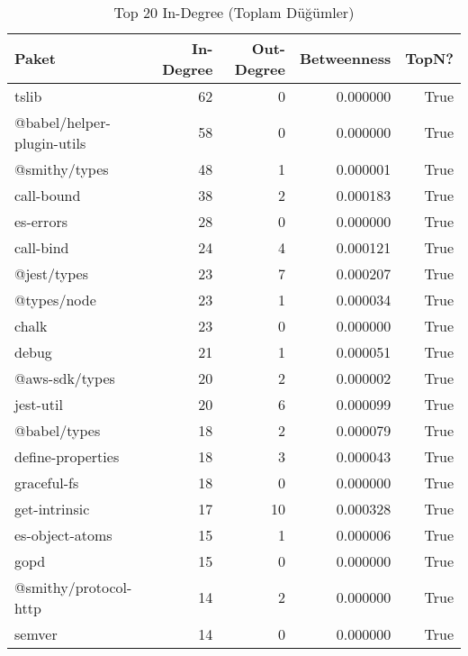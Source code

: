 \begin{table}[h]
\centering
\\\caption{Top 20 In-Degree (Toplam Düğümler)}
\begin{tabular}{lrrrr}
\toprule
Paket & In-Degree & Out-Degree & Betweenness & TopN? \\ \midrule
tslib & 62 & 0 & 0.000000 & True \\
@babel/helper-plugin-utils & 58 & 0 & 0.000000 & True \\
@smithy/types & 48 & 1 & 0.000001 & True \\
call-bound & 38 & 2 & 0.000183 & True \\
es-errors & 28 & 0 & 0.000000 & True \\
call-bind & 24 & 4 & 0.000121 & True \\
@jest/types & 23 & 7 & 0.000207 & True \\
@types/node & 23 & 1 & 0.000034 & True \\
chalk & 23 & 0 & 0.000000 & True \\
debug & 21 & 1 & 0.000051 & True \\
@aws-sdk/types & 20 & 2 & 0.000002 & True \\
jest-util & 20 & 6 & 0.000099 & True \\
@babel/types & 18 & 2 & 0.000079 & True \\
define-properties & 18 & 3 & 0.000043 & True \\
graceful-fs & 18 & 0 & 0.000000 & True \\
get-intrinsic & 17 & 10 & 0.000328 & True \\
es-object-atoms & 15 & 1 & 0.000006 & True \\
gopd & 15 & 0 & 0.000000 & True \\
@smithy/protocol-http & 14 & 2 & 0.000000 & True \\
semver & 14 & 0 & 0.000000 & True \\
\bottomrule
\end{tabular}
\end{table}
